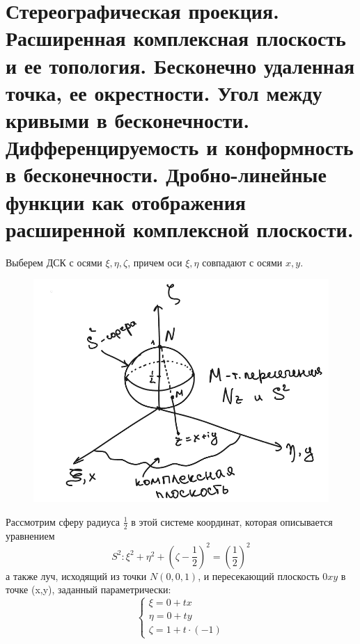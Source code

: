 \newpage
\section{Стереографическая проекция. Расширенная комплексная плоскость и ее топология. Бесконечно удаленная точка, ее окрестности. Угол между кривыми в бесконечности. Дифференцируемость и конформность в бесконечности. Дробно-линейные функции как отображения расширенной комплексной плоскости.}



Выберем ДСК с осями $\xi,\eta,\zeta$, причем оси $\xi,\eta$ совпадают с осями $x,y$.
\begin{figure}[!ht]
    \begin{center}
    \includegraphics[scale=0.7]{answers/img/3.png}
    \label{pic04}
    \end{center}
\end{figure}
Рассмотрим сферу радиуса $\frac{1}{2}$ в этой системе координат, которая описывается уравнением 
$$
S^2: \xi^2 + \eta^2 + \left(\zeta - \frac{1}{2}\right)^2 = \left(\frac{1}{2}\right)^2
$$
а также луч, исходящий из точки $N(0,0,1)$, и пересекающий плоскость $0xy$ в точке (x,y), заданный параметрически:
$$
\begin{cases}
  \xi = 0 + tx \\
  \eta = 0 + ty \\
  \zeta = 1 + t \cdot (-1)
\end{cases}
$$

